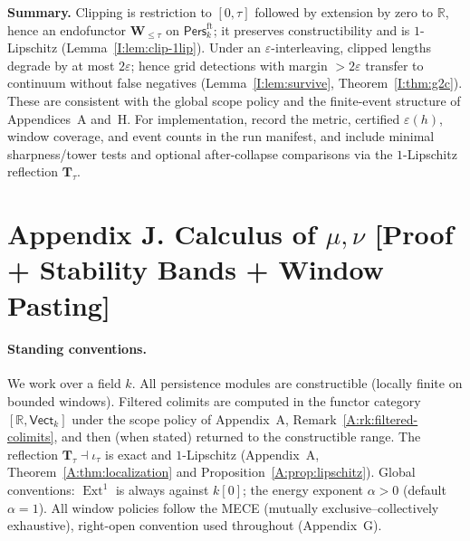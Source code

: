 \documentclass[11pt]{article}
\numberwithin{equation}{section}
\theoremstyle{plain}
\theoremstyle{definition}
\theoremstyle{remark}
\DeclareMathOperator{\Ext}{Ext}
\newcommand{\Pers}{\mathsf{Pers}}
\theoremstyle{plain}
\theoremstyle{definition}
\numberwithin{equation}{section}
\theoremstyle{definition}
\numberwithin{equation}{section}
\theoremstyle{plain}
\theoremstyle{definition}
\theoremstyle{remark}
\begin{document}
\medskip
\noindent\textbf{Summary.}
Clipping is restriction to \([0,\tau]\) followed by extension by zero to \(\mathbb{R}\), hence an endofunctor \(\mathbf{W}_{\le\tau}\) on \(\Pers^{\mathrm{ft}}_k\); it preserves constructibility and is \(1\)-Lipschitz (Lemma~\ref{I:lem:clip-1lip}). Under an \(\varepsilon\)-interleaving, clipped lengths degrade by at most \(2\varepsilon\); hence grid detections with margin \(>\!2\varepsilon\) transfer to continuum without false negatives (Lemma~\ref{I:lem:survive}, Theorem~\ref{I:thm:g2c}). These are consistent with the global scope policy and the finite-event structure of Appendices~A and~H. For implementation, record the metric, certified \(\varepsilon(h)\), window coverage, and event counts in the run manifest, and include minimal sharpness/tower tests and optional after-collapse comparisons via the \(1\)-Lipschitz reflection \(\mathbf{T}_\tau\).



\section*{Appendix J. Calculus of $\mu,\nu$ [Proof + Stability Bands + Window Pasting]}
{}
\label{J:calc}

\paragraph{Standing conventions.}
We work over a field \(k\).
All persistence modules are constructible (locally finite on bounded windows).
Filtered colimits are computed in the functor category \([\mathbb{R},\mathsf{Vect}_k]\) under the scope policy of Appendix~A, Remark~\ref{A:rk:filtered-colimits}, and then (when stated) returned to the constructible range.
The reflection \(\mathbf{T}_\tau\dashv \iota_\tau\) is exact and \(1\)-Lipschitz (Appendix~A, Theorem~\ref{A:thm:localization} and Proposition~\ref{A:prop:lipschitz}).
Global conventions: \(\Ext^1\) is always against \(k[0]\); the energy exponent \(\alpha>0\) (default \(\alpha=1\)).
All window policies follow the MECE (mutually exclusive–collectively exhaustive), right-open convention used throughout (Appendix~G).
\end{document}
